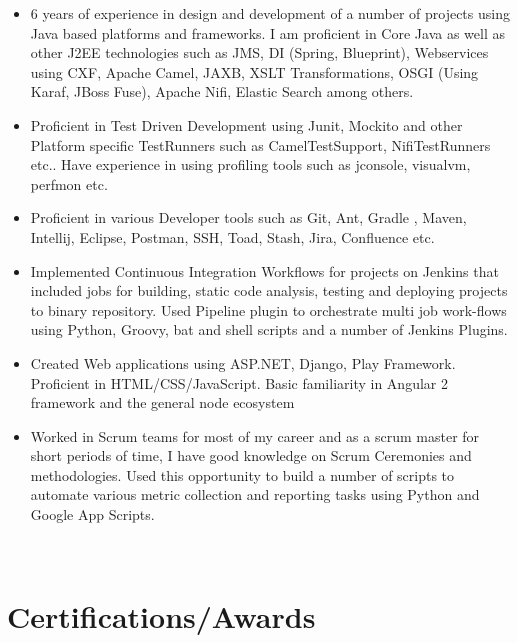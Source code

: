 \documentclass[letterpaper]{twentysecondcv} %
\begin{document}
\begin{itemize}[leftmargin=*]

	\item 6 years of experience in design and development of a number of projects using Java based platforms and frameworks. I am proficient in Core Java as well as other J2EE technologies such as JMS, DI (Spring, Blueprint), Webservices using CXF, Apache Camel, JAXB, XSLT Transformations, OSGI (Using Karaf, JBoss Fuse), Apache Nifi, Elastic Search among others. 

	\item Proficient in Test Driven Development using Junit, Mockito and other Platform specific TestRunners such as CamelTestSupport, NifiTestRunners etc.. Have experience in using profiling tools such as jconsole, visualvm, perfmon etc.

	\item Proficient in various Developer tools such as Git, Ant, Gradle , Maven, Intellij, Eclipse, Postman, SSH, Toad, Stash, Jira, Confluence etc.

	\item Implemented Continuous Integration Workflows for projects on Jenkins that included jobs for building, static code analysis, testing and deploying projects to binary repository. Used Pipeline plugin to orchestrate multi job work-flows using Python, Groovy, bat and shell scripts and a number of Jenkins Plugins.

	\item Created Web applications using ASP.NET, Django, Play Framework. Proficient in HTML/CSS/JavaScript. Basic familiarity in Angular 2 framework and the general node ecosystem

	\item Worked in Scrum teams for most of my career and as a scrum master for short periods of time, I have good knowledge on Scrum Ceremonies and methodologies. Used this opportunity to build a number of scripts to automate various metric collection and reporting tasks using Python and Google App Scripts.
\end{itemize}
~\\



\section{Certifications/Awards}
\end{document}
